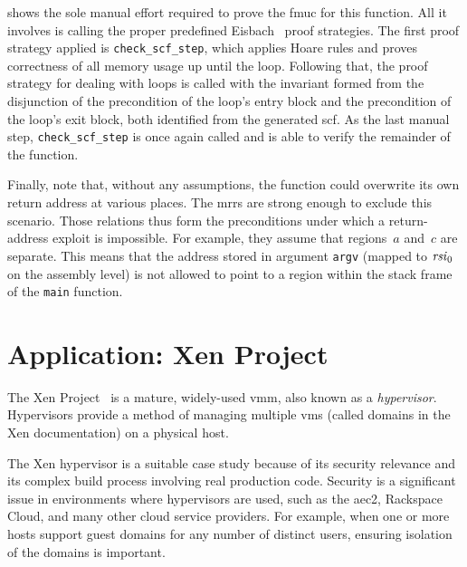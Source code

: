  shows the sole manual effort required
to prove the \ac{fmuc} for this function.
All it involves is calling the proper predefined Eisbach~\citep{matichuk2016eisbach}%
proof strategies.
The first proof strategy applied is \lstinline|check_scf_step|,
which applies Hoare rules and proves correctness of all memory usage%
%
up until the loop.
Following that, the proof strategy for dealing with loops
is called with the invariant formed from the disjunction
of the precondition of the loop's entry block%
%
and the precondition of the loop's exit block,%
both identified from the generated \ac{scf}.
As the last manual step, \lstinline|check_scf_step| is once again called
and is able to verify the remainder of the function.

Finally, note that, without any assumptions,
the function could overwrite its own return address at various places.
The \acp{mrr} are strong enough to exclude this scenario.
Those relations thus form the preconditions%
under which a return-address exploit is impossible.%
For example, they assume that regions~$a$ and~$c$ are separate.
This means that the address stored in argument \lstinline[language=C]|argv|
(mapped to $\mathit{rsi}_0$ on the assembly level)
is not allowed to point to a region
within the stack frame of the \lstinline[language=C]|main| function.

\section{Application: Xen Project}\label{se:xen}
The Xen Project~\citep{chisnall2008definitive}%
is a mature, widely-used \ac{vmm}, also known as a \emph{hypervisor}.%
Hypervisors provide a method of managing multiple
\acp{vm} (called domains in the Xen documentation) on a physical host.%

The Xen hypervisor is a suitable case study because of its security relevance%
and its complex build process involving real production code.
Security is a significant issue in environments where hypervisors are used,
such as the \ac{aec2}, Rackspace Cloud, and many other cloud service providers.
For example, when one or more hosts support guest domains
for any number of distinct users,
ensuring isolation of the domains is important.

